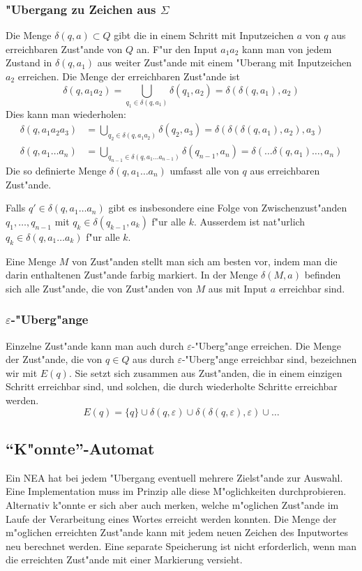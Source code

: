 \subsubsection{"Ubergang zu Zeichen aus $\Sigma$}
Die Menge $\delta(q,a)\subset Q$ gibt die in einem Schritt mit Inputzeichen $a$
von $q$ aus erreichbaren Zust"ande von $Q$ an. F"ur den Input $a_1a_2$ kann
man von jedem Zustand in $\delta(q,a_1)$ aus weiter Zust"ande mit einem
"Uberang mit Inputzeichen $a_2$ erreichen. Die Menge der erreichbaren
Zust"ande ist
\begin{equation}
\delta(q,a_1a_2)=\bigcup_{q_1\in\delta(q,a_1)}\delta(q_1, a_2)
=\delta(\delta(q,a_1),a_2)
\label{erreichbar}
\end{equation}
Dies kann man wiederholen:
\begin{align*}
\delta(q,a_1a_2a_3)&=
\bigcup_{q_2\in\delta(q, a_1a_2)}\delta(q_2,a_3)
=
\delta(\delta(\delta(q,a_1),a_2),a_3)
\\
\delta(q,a_1\dots a_n)&=\bigcup_{q_{n-1}\in\delta(q,a_1\dots a_{n-1})}\delta(q_{n-1},a_n)
=\delta(\dots \delta(q,a_1)\dots,a_n)
\end{align*}
Die so definierte Menge $\delta(q,a_1\dots a_n)$ umfasst alle von
$q$ aus erreichbaren Zust"ande.

Falls $q'\in\delta(q,a_1\dots a_n)$ gibt
es insbesondere eine Folge von Zwischenzust"anden $q_1,\dots,q_{n-1}$
mit $q_k\in\delta(q_{k-1},a_k)$ f"ur alle $k$. Ausserdem  ist
nat"urlich $q_k\in\delta(q,a_1\dots a_k)$ f"ur alle $k$.

Eine Menge $M$ von Zust"anden stellt man sich am besten vor, indem man die
darin enthaltenen Zust"ande farbig markiert. In der Menge $\delta(M,a)$
befinden sich alle Zust"ande, die von Zust"anden von $M$ aus mit Input
$a$ erreichbar sind.

\subsubsection{$\varepsilon$-"Uberg"ange}
Einzelne Zust"ande kann man auch durch $\varepsilon$-"Uberg"ange
erreichen. Die Menge der Zust"ande, die von $q\in Q$ aus durch
$\varepsilon$-"Uberg"ange erreichbar sind, bezeichnen wir mit
$E(q)$.
Sie setzt sich zusammen aus Zust"anden, die in einem einzigen 
Schritt erreichbar sind, und solchen, die durch wiederholte
Schritte erreichbar werden. 
\[
E(q)=\{q\} \cup \delta(q,\varepsilon) \cup \delta(\delta(q,\varepsilon),\varepsilon)\cup\dots
\]

\subsection{``K"onnte''-Automat\label{Thompson-NEA}}
Ein NEA hat bei jedem "Ubergang eventuell mehrere Zielst"ande zur Auswahl.
Eine Implementation muss im Prinzip alle diese M"oglichkeiten 
durchprobieren.
Alternativ k"onnte er sich aber auch merken,
welche m"oglichen Zust"ande im Laufe der Verarbeitung eines
Wortes erreicht werden konnten.
Die Menge der m"oglichen erreichten Zust"ande kann mit jedem
neuen Zeichen des Inputwortes neu berechnet werden. 
Eine separate Speicherung ist nicht erforderlich, wenn man die
erreichten Zust"ande mit einer Markierung versieht.


